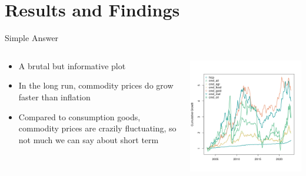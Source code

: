 \section{Results and Findings}
    \begin{frame}{Simple Answer}
        \begin{columns}
        \begin{column}{0.5\textwidth}
        \begin{itemize}
            \item<1-> A brutal but informative plot
            \item<2-> In the long run, commodity prices do grow faster than
inflation
            \item<3-> Compared to consumption goods, commodity prices are crazily fluctuating, so not much we can say about short term
        \end{itemize}
        \end{column}
        \begin{column}{0.5\textwidth}  %
            \begin{center}
             \includegraphics[width=\textwidth]{../../figures/cumgrowth.png}
             \end{center}
        \end{column}
        \end{columns}
    \end{frame}

